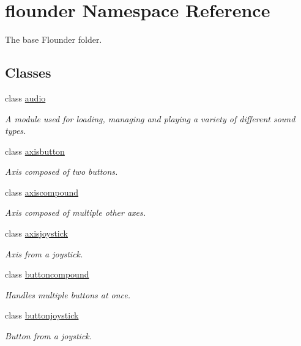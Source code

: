 \hypertarget{namespaceflounder}{}\section{flounder Namespace Reference}
\label{namespaceflounder}


The base Flounder folder.  


\subsection*{Classes}
\begin{DoxyCompactItemize}
\item 
class \hyperlink{classflounder_1_1audio}{audio}
\begin{DoxyCompactList}\small\item\em A module used for loading, managing and playing a variety of different sound types. \end{DoxyCompactList}\item 
class \hyperlink{classflounder_1_1axisbutton}{axisbutton}
\begin{DoxyCompactList}\small\item\em Axis composed of two buttons. \end{DoxyCompactList}\item 
class \hyperlink{classflounder_1_1axiscompound}{axiscompound}
\begin{DoxyCompactList}\small\item\em Axis composed of multiple other axes. \end{DoxyCompactList}\item 
class \hyperlink{classflounder_1_1axisjoystick}{axisjoystick}
\begin{DoxyCompactList}\small\item\em Axis from a joystick. \end{DoxyCompactList}\item 
class \hyperlink{classflounder_1_1buttoncompound}{buttoncompound}
\begin{DoxyCompactList}\small\item\em Handles multiple buttons at once. \end{DoxyCompactList}\item 
class \hyperlink{classflounder_1_1buttonjoystick}{buttonjoystick}
\begin{DoxyCompactList}\small\item\em Button from a joystick. \end{DoxyCompactList}\item 

\end{DoxyCompactItemize}
